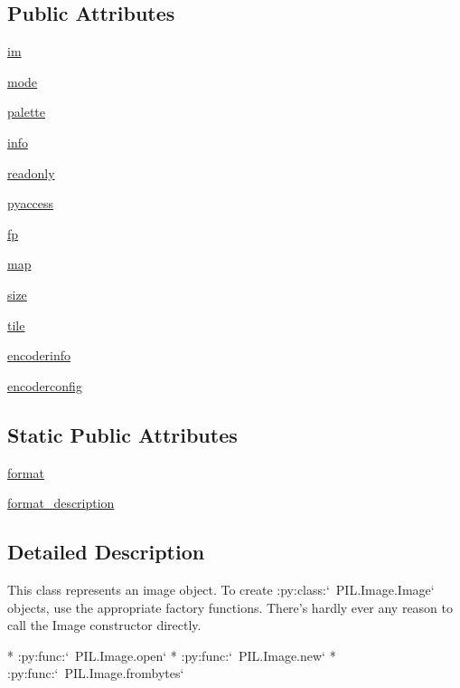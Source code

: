 \subsection*{Public Attributes}
\begin{DoxyCompactItemize}
\item 
\hyperlink{classPIL_1_1Image_1_1Image_ad64d536d671d37d388fc8896f9d493b8}{im}
\item 
\hyperlink{classPIL_1_1Image_1_1Image_a7d372be82681ec344af8a7ba8dc84d5d}{mode}
\item 
\hyperlink{classPIL_1_1Image_1_1Image_aed56de66e3c835733d852bb93673c1ab}{palette}
\item 
\hyperlink{classPIL_1_1Image_1_1Image_ab5cae44b3e263b47aeca3056bea811fd}{info}
\item 
\hyperlink{classPIL_1_1Image_1_1Image_a408d4cf4edafa5efa2a5fe873419c58e}{readonly}
\item 
\hyperlink{classPIL_1_1Image_1_1Image_a81f5d7b179f7065f4014efa5bef97ce8}{pyaccess}
\item 
\hyperlink{classPIL_1_1Image_1_1Image_a96deddd6e1e06bf4c25e974ea9f390fe}{fp}
\item 
\hyperlink{classPIL_1_1Image_1_1Image_a62074962537fcdb8b80562732a928d80}{map}
\item 
\hyperlink{classPIL_1_1Image_1_1Image_ae9939a80d0ea9392d8db8556353b2585}{size}
\item 
\hyperlink{classPIL_1_1Image_1_1Image_aa6bdff6cdea1885a34b89c993dfe598b}{tile}
\item 
\hyperlink{classPIL_1_1Image_1_1Image_ad408d66e67a29a056f75e2ed1fb89ead}{encoderinfo}
\item 
\hyperlink{classPIL_1_1Image_1_1Image_a8e9b1c63991a12d921a3bc801293b2da}{encoderconfig}
\end{DoxyCompactItemize}
\subsection*{Static Public Attributes}
\begin{DoxyCompactItemize}
\item 
\hyperlink{classPIL_1_1Image_1_1Image_a0b96af3d05c50bcbc01278bc87b84d0e}{format}
\item 
\hyperlink{classPIL_1_1Image_1_1Image_a61aa8bd7ade87bff59fa1026f1adaae1}{format\+\_\+description}
\end{DoxyCompactItemize}


\subsection{Detailed Description}
\begin{DoxyVerb}This class represents an image object.  To create
:py:class:`~PIL.Image.Image` objects, use the appropriate factory
functions.  There's hardly ever any reason to call the Image constructor
directly.

* :py:func:`~PIL.Image.open`
* :py:func:`~PIL.Image.new`
* :py:func:`~PIL.Image.frombytes`
\end{DoxyVerb}
 

